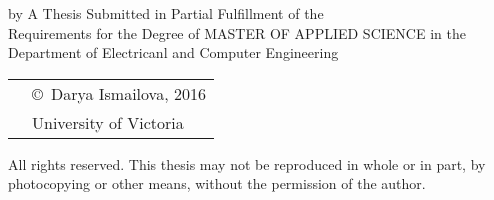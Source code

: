 \pagebreak
{
\centering
\thesistitle
\tpbreak
by
\tpbreak
\nameanddegrees
\tpbreak
A Thesis Submitted in Partial Fulfillment of the \\
Requirements for the Degree of
\tpbreak
MASTER OF APPLIED SCIENCE
\tpbreak
in the Department of Electricanl and Computer Engineering\\
\vfill
\begin{tabular}{cl}
& \copyright\ Darya Ismailova, 2016\\
& \phantom{\copyright} University of Victoria
\end{tabular}
\tpbreak
All rights reserved. This thesis may not be reproduced in whole or in part, by \\
\hfill photocopying or other means, without the permission of the author. 
\hfill
}
\pagebreak
